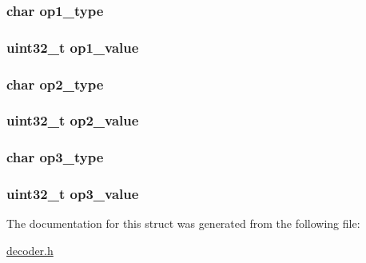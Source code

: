\subsubsection[{op1\+\_\+type}]{\setlength{\rightskip}{0pt plus 5cm}char op1\+\_\+type}\label{structinstruction__t_a1cc287607a538d246fe4959fe2924e9f}
\hypertarget{structinstruction__t_a53c64a6926b4d637f4b71f07c44f2b36}{}
\subsubsection[{op1\+\_\+value}]{\setlength{\rightskip}{0pt plus 5cm}uint32\+\_\+t op1\+\_\+value}\label{structinstruction__t_a53c64a6926b4d637f4b71f07c44f2b36}
\hypertarget{structinstruction__t_a4dae1a884cb0e3a93cbc2a3cbed035d8}{}
\subsubsection[{op2\+\_\+type}]{\setlength{\rightskip}{0pt plus 5cm}char op2\+\_\+type}\label{structinstruction__t_a4dae1a884cb0e3a93cbc2a3cbed035d8}
\hypertarget{structinstruction__t_aadc9bf8dbe3cc84d8c5026fc1da8f401}{}
\subsubsection[{op2\+\_\+value}]{\setlength{\rightskip}{0pt plus 5cm}uint32\+\_\+t op2\+\_\+value}\label{structinstruction__t_aadc9bf8dbe3cc84d8c5026fc1da8f401}
\hypertarget{structinstruction__t_a456dc78cae77a4ca1f40dccc2c50230e}{}
\subsubsection[{op3\+\_\+type}]{\setlength{\rightskip}{0pt plus 5cm}char op3\+\_\+type}\label{structinstruction__t_a456dc78cae77a4ca1f40dccc2c50230e}
\hypertarget{structinstruction__t_adef05908e0dd97c258edf143eab1750f}{}
\subsubsection[{op3\+\_\+value}]{\setlength{\rightskip}{0pt plus 5cm}uint32\+\_\+t op3\+\_\+value}\label{structinstruction__t_adef05908e0dd97c258edf143eab1750f}


The documentation for this struct was generated from the following file\+:\begin{DoxyCompactItemize}
\item 
\hyperlink{decoder_8h}{decoder.\+h}\end{DoxyCompactItemize}
